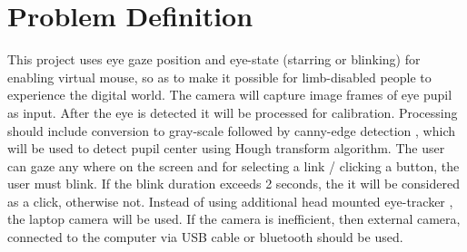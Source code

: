 \documentclass[12pt,singleside,a4paper]{article}
\begin{document}
\section*{Problem Definition}
\par This project uses eye gaze position and eye-state (starring or blinking) for enabling virtual mouse, so as to make it possible for limb-disabled people to experience the digital world. The camera will capture image frames of eye pupil as input. After  the eye is detected it will be processed for calibration. Processing should include conversion to gray-scale followed by canny-edge detection , which will be used to detect pupil center using Hough transform algorithm.\vspace{2mm}\newline
The user can gaze any where on the screen and for selecting a link / clicking a button, the user must blink. If the blink duration exceeds 2 seconds, the it will be considered as a click, otherwise not. Instead of using additional head mounted eye-tracker , the laptop camera will be used. If the camera is inefficient, then external camera, connected to the computer via USB cable or bluetooth should be used.
\pagebreak
%
%
\end{document}
